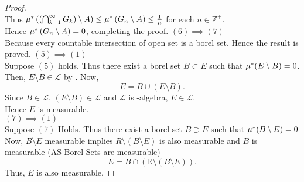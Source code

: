 \begin{proof}
\[    \]
    Thus $\mu^{*}\left(\left( \bigcap_{k=1}^{\infty}G_k \right)\setminus A\right)\le \mu^{*}\left( G_n\setminus A\right)\le \frac{1}{n}$ for each $n\in\mathds{Z}^{+}$.\\
    Hence $\mu^{*}\left( G_n\setminus A\right)=0$, completing the proof.
    \textbf{$(6)\implies(7)$}\\
    Because every countable intersection of open set is a borel set. Hence the result is proved.
    \textbf{$(5)\implies(1)$}\\
    Suppose $(5)$ holds. Thus there exist a borel set  $B\subset E$ such that  $\mu^{*}(E\setminus B)=0$.
    Then, $E\setminus B\in \mathcal{L}$ by . Now, 
    \[
        E=B\cup(E\setminus B).
    \]
    Since $B\in\mathcal{L}$,  $(E\setminus B)\in\mathcal{L}$ and  $\mathcal{L}$ is \sig-algebra,  $E\in\mathcal{L}$.\\
    Hence  $E$ is measurable.\\
    \textbf{$(7)\implies(1)$}\\
    Suppose $(7)$ Holds. Thus there exist a borel set  $B\supset E$ such that  $\mu^{*}(B\setminus E)=0$
    Now, $B\setminus E$ measurable implies $R\setminus (B\setminus E)$ is also measurable and $B$ is measurable (AS Borel Sets are measurable)
     \[
        E=B\cap(\mathds{R}\setminus (B\setminus E)).
    \]
    Thus, $E$ is also measurable.
\end{proof}
